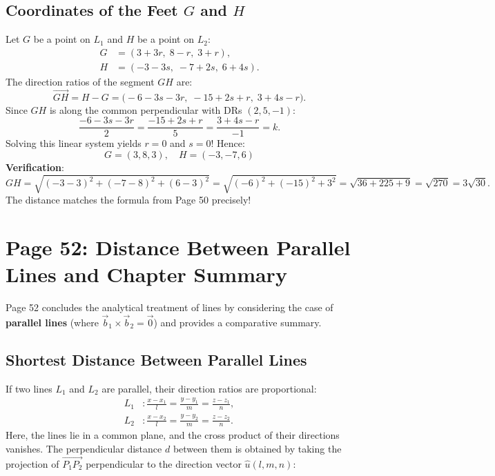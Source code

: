\subsection{Coordinates of the Feet $G$ and $H$}
Let $G$ be a point on $L_1$ and $H$ be a point on $L_2$:
\begin{align}
    G &= (3 + 3r, \; 8 - r, \; 3 + r), \\
    H &= (-3 - 3s, \; -7 + 2s, \; 6 + 4s).
\end{align}
The direction ratios of the segment $GH$ are:
\begin{equation}
    \vec{GH} = H - G = \bigl(-6 - 3s - 3r, \; -15 + 2s + r, \; 3 + 4s - r\bigr).
\end{equation}
Since $GH$ is along the common perpendicular with DRs $(2, 5, -1)$:
\begin{equation}
    \frac{-6 - 3s - 3r}{2} = \frac{-15 + 2s + r}{5} = \frac{3 + 4s - r}{-1} = k.
\end{equation}
Solving this linear system yields $r = 0$ and $s = 0$!
Hence:
\begin{equation}
    \boxed{G = (3, 8, 3), \quad H = (-3, -7, 6)}
\end{equation}
\textbf{Verification}:
\begin{equation}
    GH = \sqrt{(-3-3)^2 + (-7-8)^2 + (6-3)^2} = \sqrt{(-6)^2 + (-15)^2 + 3^2} = \sqrt{36 + 225 + 9} = \sqrt{270} = 3\sqrt{30}.
\end{equation}
The distance matches the formula from Page 50 precisely!

\section{Page 52: Distance Between Parallel Lines and Chapter Summary}
\label{sec:page52}

\begin{conceptbox}
Page 52 concludes the analytical treatment of lines by considering the case of \textbf{parallel lines} (where $\vec{b}_1 \times \vec{b}_2 = \vec{0}$) and provides a comparative summary.
\end{conceptbox}

\subsection{Shortest Distance Between Parallel Lines}
If two lines $L_1$ and $L_2$ are parallel, their direction ratios are proportional:
\begin{align}
    L_1 &: \frac{x - x_1}{l} = \frac{y - y_1}{m} = \frac{z - z_1}{n}, \\
    L_2 &: \frac{x - x_2}{l} = \frac{y - y_2}{m} = \frac{z - z_2}{n}.
\end{align}
Here, the lines lie in a common plane, and the cross product of their directions vanishes.
The perpendicular distance $d$ between them is obtained by taking the projection of $\vec{P_1 P_2}$ perpendicular to the direction vector $\hat{u}(l, m, n)$:

